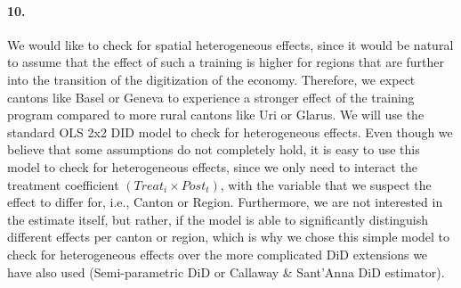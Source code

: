 \documentclass{scrartcl}
\begin{document}
\paragraph*{10.}

We would like to check for spatial heterogeneous effects, since it would be natural to assume that the effect of such a training is higher for regions that are further into the transition of the digitization of the economy. Therefore, we expect cantons like Basel or Geneva to experience a stronger effect of the training program compared to more rural cantons like Uri or Glarus. We will use the standard OLS 2x2 DID model to check for heterogeneous effects. Even though we believe that some assumptions do not completely hold, it is easy to use this model to check for heterogeneous effects, since we only need to interact the treatment coefficient $(Treat_i  \times Post_t)$, with the variable that we suspect the effect to differ for, i.e., Canton or Region. Furthermore, we are not interested in the estimate itself, but rather, if the model is able to significantly distinguish different effects per canton or region, which is why we chose this simple model to check for heterogeneous effects over the more complicated DiD extensions we have also used (Semi-parametric DiD or Callaway \& Sant'Anna DiD estimator).
\end{document}
